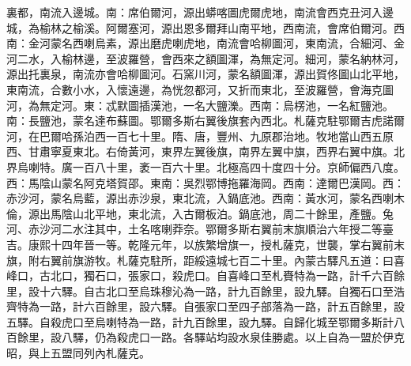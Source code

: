 \begin{pinyinscope}
裏都，南流入邊城。南：席伯爾河，源出蟒喀圖虎爾虎地，南流會西克丑河入邊城，為榆林之榆溪。阿爾塞河，源出恩多爾拜山南平地，西南流，會席伯爾河。西南：金河蒙名西喇烏素，源出磨虎喇虎地，南流會哈柳圖河，東南流，合細河、金河二水，入榆林邊，至波羅營，會西來之額圖渾，為無定河。細河，蒙名納林河，源出托裏泉，南流亦會哈柳圖河。石窯川河，蒙名額圖渾，源出賀佟圖山北平地，東南流，合數小水，入懷遠邊，為恍忽都河，又折而東北，至波羅營，會海克圖河，為無定河。東：忒默圖插漢池，一名大鹽濼。西南：烏楞池，一名紅鹽池。南：長鹽池，蒙名達布蘇圖。鄂爾多斯右翼後旗套內西北。札薩克駐鄂爾吉虎諾爾河，在巴爾哈孫泊西一百七十里。隋、唐，豐州、九原郡治地。牧地當山西五原西、甘肅寧夏東北。右倚黃河，東界左翼後旗，南界左翼中旗，西界右翼中旗。北界烏喇特。廣一百八十里，袤一百六十里。北極高四十度四十分。京師偏西八度。西：馬陰山蒙名阿克塔賀邵。東南：吳烈鄂博拖羅海岡。西南：達爾巴漢岡。西：赤沙河，蒙名烏藍，源出赤沙泉，東北流，入鍋底池。西南：黃水河，蒙名西喇木倫，源出馬陰山北平地，東北流，入古爾板泊。鍋底池，周二十餘里，產鹽。兔河、赤沙河二水注其中，土名喀喇莽奈。鄂爾多斯右翼前末旗順治六年授二等臺吉。康熙十四年晉一等。乾隆元年，以族繁增旗一，授札薩克，世襲，掌右翼前末旗，附右翼前旗游牧。札薩克駐所，距綏遠城七百二十里。內蒙古驛凡五道：曰喜峰口，古北口，獨石口，張家口，殺虎口。自喜峰口至札賚特為一路，計千六百餘里，設十六驛。自古北口至烏珠穆沁為一路，計九百餘里，設九驛。自獨石口至浩齊特為一路，計六百餘里，設六驛。自張家口至四子部落為一路，計五百餘里，設五驛。自殺虎口至烏喇特為一路，計九百餘里，設九驛。自歸化城至鄂爾多斯計八百餘里，設八驛，仍為殺虎口一路。各驛站均設水泉佳勝處。以上自為一盟於伊克昭，與上五盟同列內札薩克。


\end{pinyinscope}